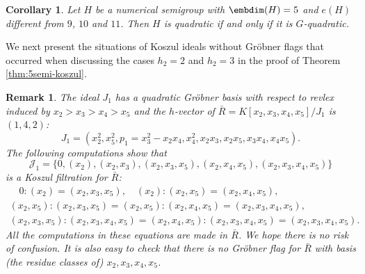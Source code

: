 \documentclass[12pt]{amsart}
\newtheorem{Corollary}[Theorem]{Corollary}
\newtheorem{Remark}[Theorem]{Remark}
\begin{document}
\begin{Corollary}
Let $H$ be a numerical semigroup with $\embdim(H)=5$ and $e(H)$ different from $9$, $10$ and $11$. 
 Then  $H$ is quadratic if and only if it is $G$-quadratic.
\end{Corollary}
 
We next present the  situations of Koszul ideals without Gr\"obner flags that occurred when discussing the  cases $h_2=2$ and $h_2=3$ in the proof of Theorem \ref{thm:5semi-koszul}.

\begin{Remark}
\label{rem:h2-nonflag}
{\em  
The   ideal $J_1$ has a quadratic Gr\"obner basis with respect to revlex induced by $x_2>x_3>x_4>x_5$ and the $h$-vector of $\bar{R}=K[x_2,x_3, x_4,x_5]/J_1$ is $(1,4,2)$: 
\begin{equation*}
J_1=(x_2^2, x_5^2, p_1=x_3^2-x_2x_4, x_4^2, x_2x_3, x_2 x_5, x_3 x_4, x_4x_5 ).
\end{equation*} 
The following computations show that 
$$
\mathcal{J}_1= \{ 0, (x_2), (x_2,x_3),  (x_2, x_3, x_5), (x_2, x_4, x_5), (x_2, x_3, x_4, x_5)\}
$$
 is a Koszul filtration for $\bar{R}$:
\begin{eqnarray*}
\quad 0: (x_2)= (x_2, x_3, x_5), \quad (x_2):(x_2,x_5)= (x_2, x_4, x_5), \\
(x_2, x_5): (x_2, x_3, x_5)=(x_2, x_5): (x_2, x_4, x_5)=(x_2, x_3, x_4, x_5),  \\
(x_2, x_3, x_5): (x_2, x_3, x_4, x_5)= (x_2, x_4, x_5): (x_2, x_3, x_4, x_5)=(x_2, x_3, x_4, x_5). 
\end{eqnarray*}
All the computations in these equations are made in $\bar{R}$. We hope there is no risk of confusion.
It is also easy to check that there is no Gr\"obner flag for $\bar{R}$ with basis (the residue classes of) $x_2, x_3, x_4, x_5$.
}
\end{Remark}
\end{document}
